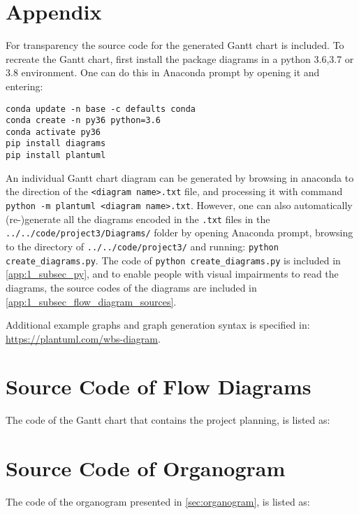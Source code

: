 \section{Appendix}\label{app:1}
For transparency the source code for the generated Gantt chart is included. To recreate the Gantt chart, first install the package diagrams in a python 3.6,3.7 or 3.8 environment. One can do this in Anaconda prompt by opening it and entering:
\begin{verbatim}
conda update -n base -c defaults conda
conda create -n py36 python=3.6
conda activate py36
pip install diagrams
pip install plantuml
\end{verbatim}

\noindent An individual Gantt chart diagram can be generated by browsing in anaconda to the direction of the \verb+<diagram name>.txt+ file, and processing it with command \verb+python -m plantuml <diagram name>.txt+. However, one can also automatically (re-)generate all the diagrams encoded in the \verb+.txt+ files in the \verb+../../code/project3/Diagrams/+ folder by opening Anaconda prompt, browsing to the directory of \verb+../../code/project3/+ and running: \verb+python create_diagrams.py+. The code of \verb+python create_diagrams.py+ is included in \cref{app:1_subsec_py}, and to enable people with visual impairments to read the diagrams, the source codes of the diagrams are included in \cref{app:1_subsec_flow_diagram_sources}.

\noindent Additional example graphs and graph generation syntax is specified in: \url{https://plantuml.com/wbs-diagram}.

\newpage

\newpage
\section{Source Code of Flow Diagrams}\label{app:1_sec_flow_diagram_sources}
The code of the Gantt chart that contains the project planning, is listed as:


\newpage
\section{Source Code of Organogram}\label{app:1_sec_organogram}
The code of the organogram presented in \cref{sec:organogram}, is listed as:

